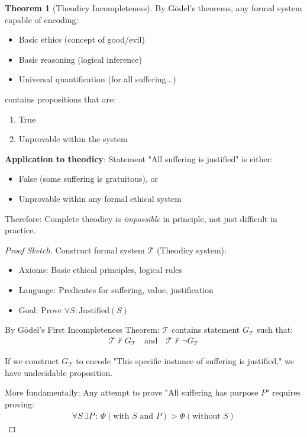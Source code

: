 \documentclass[11pt,a4paper]{article}
\theoremstyle{definition}
\newtheorem{theorem}{Theorem}[section]
\theoremstyle{remark}
\begin{document}
\begin{small}
\begin{enumerate}
\begin{theorem}[Theodicy Incompleteness]
By Gödel's theorems, any formal system capable of encoding:
\begin{itemize}
    \item Basic ethics (concept of good/evil)
    \item Basic reasoning (logical inference)
    \item Universal quantification (for all suffering...)
\end{itemize}

contains propositions that are:
\begin{enumerate}
    \item True
    \item Unprovable within the system
\end{enumerate}

\textbf{Application to theodicy}: Statement "All suffering is justified" is either:
\begin{itemize}
    \item False (some suffering is gratuitous), or
    \item Unprovable within any formal ethical system
\end{itemize}

Therefore: Complete theodicy is \textit{impossible} in principle, not just difficult in practice.
\end{theorem}

\begin{proof}[Proof Sketch]
Construct formal system \(\mathcal{T}\) (Theodicy system):
\begin{itemize}
    \item Axioms: Basic ethical principles, logical rules
    \item Language: Predicates for suffering, value, justification
    \item Goal: Prove \(\forall S: \text{Justified}(S)\)
\end{itemize}

By Gödel's First Incompleteness Theorem: \(\mathcal{T}\) contains statement \(G_{\mathcal{T}}\) such that:
\begin{align}
\mathcal{T} \nvdash G_{\mathcal{T}} \quad \text{and} \quad \mathcal{T} \nvdash \neg G_{\mathcal{T}}
\end{align}

If we construct \(G_{\mathcal{T}}\) to encode "This specific instance of suffering is justified," we have undecidable proposition.

More fundamentally: Any attempt to prove "All suffering has purpose \(P\)" requires proving:
\begin{align}
\forall S \, \exists P \, : \, \Phi(\text{with } S \text{ and } P) > \Phi(\text{without } S)
\end{align}


\end{proof}
\end{enumerate}
\end{small}
\end{document}
